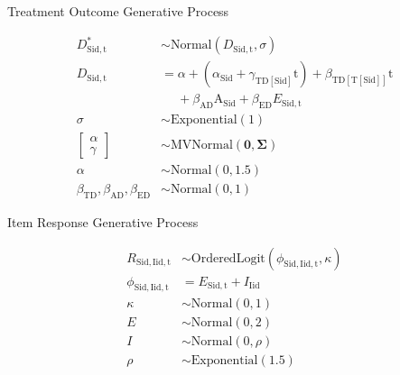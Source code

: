 \documentclass[12pt,preview,border=5mm]{standalone}
\begin{document}
 

\newcommand{\midx}[2]{ \mathrm{#1},\mathrm{#2} }
\newcommand{\aidx}[3]{ \mathrm{#1},\mathrm{#2},\mathrm{#3} }
\newcommand{\vidx}[1]{ \mathrm{#1} }
\newcommand{\annot}[1]{ \begin{center} {\scriptsize #1} \end{center}}
\newcommand{\bb}[1]{ \beta_{\mathrm{#1}} }
\newcommand{\gm}[1]{ \gamma_{\mathrm{#1}} }

\annot{Treatment Outcome Generative Process}
\begin{equation}
    \begin{aligned}
       D^{\ast}_{\midx{Sid}{t}}                       & \sim \text{Normal}( D_{\midx{Sid}{t}}, \sigma )                       \\
       D_{\midx{Sid}{t}}                              & = \alpha + (\alpha_{\vidx{Sid}} + \gm{TD[\vidx{Sid}]} \text{t}) + \bb{TD [T[\vidx{Sid}]]} \text{t} \\
                                                      & \phantom{PP} + \bb{AD} \text{A}_{\vidx{Sid}} + \bb{ED} E_{\midx{Sid}{t}} \\
       \sigma                                         & \sim \text{Exponential}(1) \\
       \begin{bmatrix} \alpha \\ \gamma \end{bmatrix} & \sim \text{MVNormal}(\pmb{0}, \pmb{\Sigma}) \\
       \alpha                                         & \sim \text{Normal}(0, 1.5) \\
       \bb{TD}, \bb{AD}, \bb{ED}                      & \sim \text{Normal}(0, 1)
    \end{aligned}
\end{equation}
 
\annot{Item Response Generative Process}
\begin{equation}
    \begin{aligned}
       R_{\aidx{Sid}{Iid}{t}}    &\sim \text{OrderedLogit}( \phi_{\aidx{Sid}{Iid}{t}}, \kappa )    \\
       \phi_{\aidx{Sid}{Iid}{t}} &= E_{\midx{Sid}{t}} + I_{\vidx{Iid}}                           \\
       \kappa               &\sim \text{Normal}(0, 1)         \\
       E                    &\sim \text{Normal}(0, 2)         \\
       I                    &\sim \text{Normal}(0, \rho)      \\
       \rho                 &\sim \text{Exponential}(1.5)
    \end{aligned}
\end{equation}
 
\end{document}
